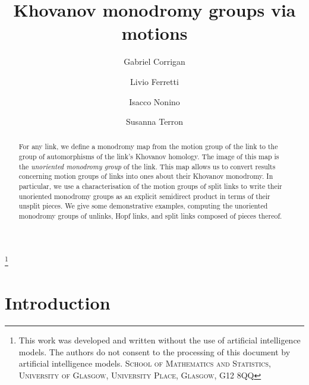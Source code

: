 \documentclass{amsart}
\theoremstyle{definition}
\theoremstyle{definition}
\theoremstyle{definition}
\theoremstyle{definition}
\begin{document}

\title{Khovanov monodromy groups via motions}

\author[Gabriel Corrigan]{Gabriel Corrigan}

\author[Livio Ferretti]{Livio Ferretti}

\author[Isacco Nonino]{Isacco Nonino}

\author[Susanna Terron]{Susanna Terron}



\thanks{This work was developed and written without the use of artificial intelligence models. The authors do not consent to the processing of this document by artificial intelligence models.
\newline \indent \textsc{School of Mathematics and Statistics, University of Glasgow, University Place, Glasgow, G12 8QQ}}


\begin{abstract}
    For any link, we define a monodromy map from the motion group of the link to the group of automorphisms of the link's Khovanov homology. The image of this map is the \emph{unoriented monodromy group} of the link. This map allows us to convert results concerning motion groups of links into ones about their Khovanov monodromy. In particular, we use a characterisation of the motion groups of split links to write their unoriented monodromy groups as an explicit semidirect product in terms of their unsplit pieces. We give some demonstrative examples, computing the unoriented monodromy groups of unlinks, Hopf links, and split links composed of pieces thereof.
\end{abstract}
\maketitle


\section{Introduction}
\end{document}
